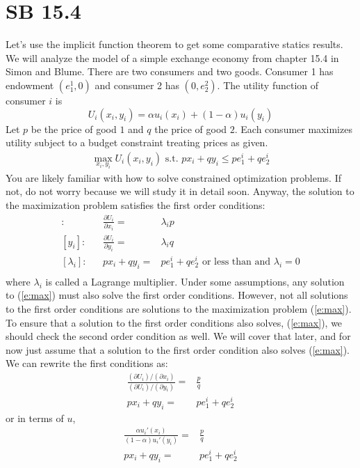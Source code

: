 

\section{SB 15.4}
Let's use the implicit function theorem to get some comparative
statics results. We will analyze the model of a simple exchange
economy from chapter 15.4 in Simon and Blume. There are two consumers
and two goods. Consumer 1 has endowment $(e^1_1,0)$ and consumer 2 has
$(0,e^2_2)$. The utility function of consumer $i$ is 
\[ U_i(x_i,y_i) = \alpha u_i(x_i) + (1-\alpha) u_i(y_i) \]
Let $p$ be the price of good $1$ and $q$ the price of good $2$. Each
consumer maximizes utility subject to a budget constraint treating
prices as given.
\begin{align}
  \max_{x_i,y_i} U_i(x_i,y_i) \text{ s.t. } p x_i + q y_i \leq p
  e_1^i + q e_2^i  \label{e:max}
\end{align}
You are likely familiar with how to solve constrained optimization
problems. If not, do not worry because we will study it in detail
soon. Anyway, the solution to the maximization problem satisfies the
first order conditions:
\begin{align*}
  [x_i]: & & \frac{\partial U_i}{\partial x_i} = & \lambda_i p \\
  [y_i]: & & \frac{\partial U_i}{\partial y_i} = & \lambda_i q \\
  [\lambda_i]: & &  p x_i + q y_i = &  p e_1^i + q e_2^i  \text{ or
    less than and }
  \lambda_i = 0\\
\end{align*}
where $\lambda_i$ is called a Lagrange multiplier. Under some
assumptions, any solution to (\ref{e:max}) must also solve the first
order conditions. However, not all solutions to the first order
conditions are solutions to the maximization problem (\ref{e:max}). To
ensure that a solution to the first order conditions also solves,
(\ref{e:max}), we should check the second order condition as well. We
will cover that later, and for now just assume that a solution to the
first order condition also solves (\ref{e:max}). We can rewrite the
first conditions as:
\begin{align*}
  \frac{ (\partial U_i)/(\partial x_i) }{ (\partial U_i)/(\partial
    y_i)} = & \frac{p}{q} \\
  p x_i + q y_i = &  p e_1^i + q e_2^i
\end{align*}
or in terms of $u$,
\begin{align}
  \frac{ \alpha u_i'(x_i) }{ (1-\alpha) u_i'(y_i) } = &
  \frac{p}{q} \label{ir} \\ 
  p x_i + q y_i = &  p e_1^i + q e_2^i \label{bc}
\end{align}
